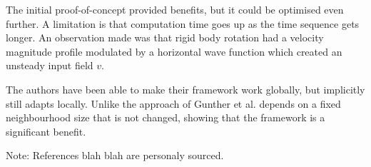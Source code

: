 \documentclass[a4paper,9pt]{article}
\begin{document}
The initial proof-of-concept provided benefits, but it could be optimised even further. A limitation is that computation time goes up as the time sequence gets longer. An observation made was that rigid body rotation had a velocity magnitude profile modulated by a horizontal wave function which created an unsteady input field $v$.

The authors have been able to make their framework work globally, but implicitly still adapts locally. Unlike the approach of Gunther et al. \cite{17} depends on a fixed neighbourhood size that is not changed, showing that the framework is a significant benefit.




\medskip
\newpage



Note: References blah blah are personaly sourced.
\end{document}
